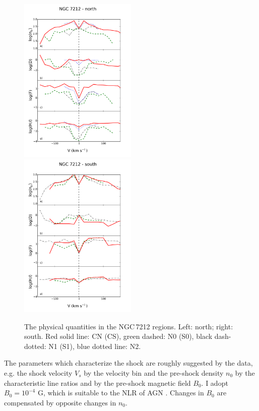 \documentclass[../thesis.tex]{subfiles}
\begin{document}
\begin{figure}
\includegraphics[width=0.5\textwidth]{images/paper1/n72n.pdf}
\includegraphics[width=0.5\textwidth]{images/paper1/n72s.pdf}
\caption{The physical quantities in the NGC\,7212 regions. Left: north; right: south. Red solid line: CN (CS), green dashed: N0 (S0), black dash-dotted: N1 (S1), blue dotted line: N2.}
\label{fig:NGC_m}
\end{figure}


The parameters which characterize the shock are roughly suggested by the data, e.g. the  shock velocity $V_s$ by the velocity bin and the pre-shock density $n_0$ by the characteristic line ratios and by the pre-shock magnetic field $B_0$.
I adopt $B_0  = 10^{-4}$ G, which is suitable to the NLR of AGN \citep{Beck12}.
Changes in $B_0$  are compensated by opposite changes in $n_0$.
\end{document}
